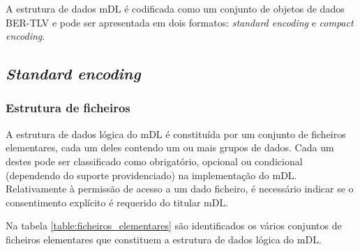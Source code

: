 A estrutura de dados mDL é codificada como um conjunto de objetos de dados BER-TLV e pode ser apresentada em dois formatos: \textit{standard encoding} e \textit{compact encoding}.


\subsection{\textit{Standard encoding}}


\subsubsection{Estrutura de ficheiros}

A estrutura de dados lógica do mDL é constituída por um conjunto de ficheiros elementares, cada um deles contendo um ou mais grupos de dados. Cada um destes pode ser classificado como obrigatório, opcional ou condicional (dependendo do suporte providenciado) na implementação do mDL. Relativamente à permissão de acesso a um dado ficheiro, é necessário indicar se o consentimento explícito é requerido do titular mDL.

Na tabela \ref{table:ficheiros_elementares} são identificados os vários conjuntos de ficheiros elementares que constituem a estrutura de dados lógica do mDL.

